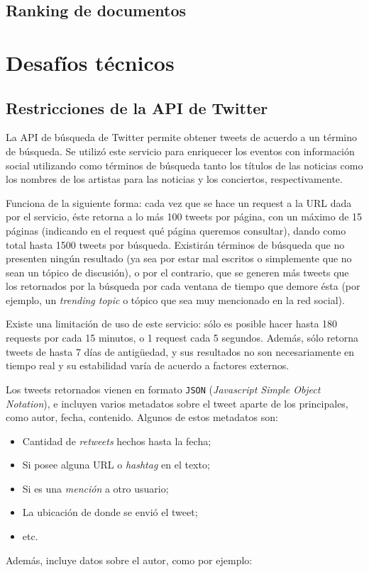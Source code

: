 \subsection{Ranking de documentos}
\label{sec-1.2.3}


\section{Desafíos técnicos}
\label{sec-1.3}

\subsection{Restricciones de la API de Twitter}
\label{sec-1.3.1}


   La API de búsqueda de Twitter permite obtener tweets de acuerdo a un
   término de búsqueda. Se utilizó este servicio para enriquecer los
   eventos con información social utilizando como términos de búsqueda
   tanto los títulos de las noticias como los nombres de los artistas
   para las noticias y los conciertos, respectivamente.

   Funciona de la siguiente forma: cada vez que se hace un request a la
   URL dada por el servicio, éste retorna a lo más 100 tweets por página, con un
   máximo de 15 páginas (indicando en el request qué página queremos
   consultar), dando como total hasta 1500 tweets por búsqueda. Existirán
   términos de búsqueda que no presenten ningún resultado  (ya sea por
   estar mal escritos o simplemente que no sean un tópico de discusión), o por
   el contrario, que se generen más tweets que los retornados por la
   búsqueda por cada ventana de tiempo que demore ésta (por ejemplo, un
   \emph{trending topic} o tópico que sea muy mencionado en la red social).

   Existe una limitación de uso de este servicio: sólo es posible hacer
   hasta 180 requests por cada 15 minutos, o 1 request cada 5
   segundos. Además, sólo retorna tweets de hasta 7 días de antigüedad, y
   sus resultados no son necesariamente en tiempo real y su estabilidad
   varía de acuerdo a factores externos.

   Los tweets retornados vienen en formato \texttt{JSON} (\emph{Javascript Simple Object Notation}),
   e incluyen varios metadatos sobre el tweet aparte de los principales,
   como autor, fecha, contenido. Algunos de estos metadatos son:

\begin{itemize}
\item Cantidad de \emph{retweets} hechos hasta la fecha;
\item Si posee alguna URL o \emph{hashtag} en el texto;
\item Si es una \emph{mención} a otro usuario;
\item La ubicación de donde se envió el tweet;
\item etc.
\end{itemize}
  Además, incluye datos sobre el autor, como por ejemplo:

